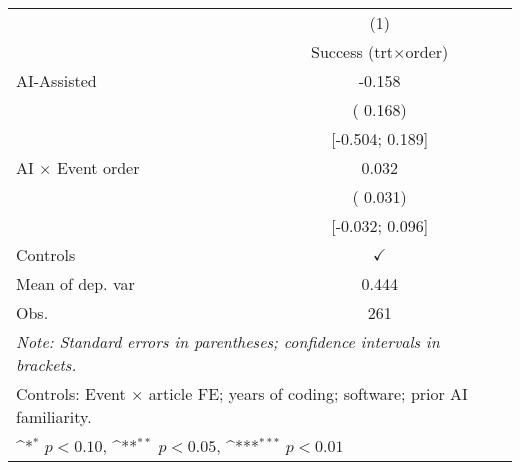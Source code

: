 \def\sym#1{\ifmmode^{#1}\else\(^{#1}\)\fi}
\begin{tabular}{l*{1}{c}}
\hline\hline
 & (1)
\\
 & Success (trt×order)
 \\
\hline
AI-Assisted & -0.158
\\
 & ( 0.168)
\\
 & [-0.504;  0.189]
\\
AI × Event order &  0.032
\\
 & ( 0.031)
\\
 & [-0.032;  0.096]
\\
\hline
Controls & $\checkmark$
\\
Mean of dep. var &  0.444
\\
Obs. & 261
\\
\hline
\hline\hline
\multicolumn{2}{l}{\it{Note:} Standard errors in parentheses; confidence intervals in brackets.}\\
\multicolumn{2}{l}{Controls: Event $\times$ article FE; years of coding; software; prior AI familiarity.}\\
\multicolumn{2}{l}{\sym{*} $p<0.10$, \sym{**} $p<0.05$,  \sym{***} $p<0.01$}\\
\end{tabular}
